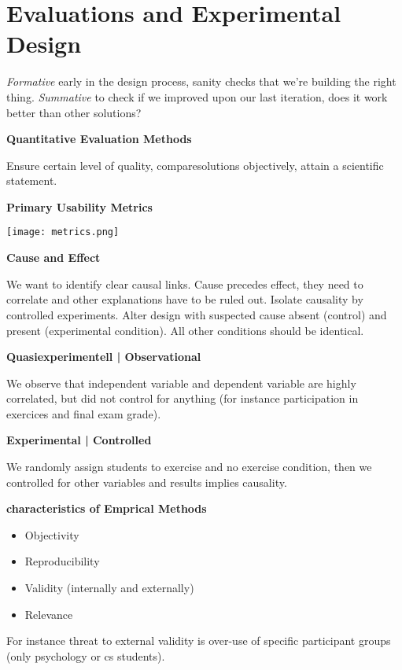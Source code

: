 \section{Evaluations and Experimental Design}

\textit{Formative} early in the design process, sanity checks that we're building the right thing. \textit{Summative} to check if we improved upon our last iteration, does it work better than other solutions? \medskip

\textbf{Quantitative Evaluation Methods}

Ensure certain level of quality, comparesolutions objectively, attain a scientific statement. \medskip

\textbf{Primary Usability Metrics} \smallskip

\begin{center}
	\texttt{[image: metrics.png]}
\end{center}

\textbf{Cause and Effect} \smallskip

We want to identify clear causal links. Cause precedes effect, they need to correlate and other explanations have to be ruled out. 
Isolate causality by controlled experiments. Alter design with suspected cause absent (control) and present (experimental condition).
All other conditions should be identical. \medskip

\textbf{Quasiexperimentell | Observational} \smallskip

We observe that independent variable and dependent variable are highly correlated, but did not control for anything (for instance participation in exercices and final exam grade). \medskip

\textbf{Experimental | Controlled} \smallskip

We randomly assign students to exercise and no exercise condition, then we controlled for other variables and results implies causality. \medskip


\textbf{characteristics of Emprical Methods}

\begin{itemize}
    \item Objectivity
    \item Reproducibility
    \item Validity (internally and externally)
    \item Relevance
\end{itemize}

For instance threat to external validity is over-use of specific participant groups (only psychology or cs students). \medskip

